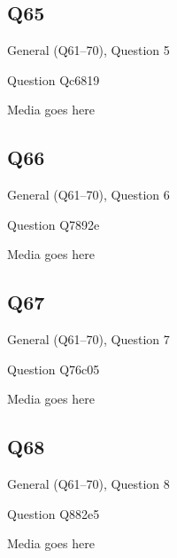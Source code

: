 \documentclass[11pt]{beamer}
\begin{document}
\subsection*{Q65}
\begin{frame}[t]{General (Q61--70), Question 5}
\vspace{2em}
\begin{block}{Question}
Qc6819
\end{block}
\begin{center}
Media goes here
\end{center}
\end{frame}
    

\subsection*{Q66}
\begin{frame}[t]{General (Q61--70), Question 6}
\vspace{2em}
\begin{block}{Question}
Q7892e
\end{block}
\begin{center}
Media goes here
\end{center}
\end{frame}
    

\subsection*{Q67}
\begin{frame}[t]{General (Q61--70), Question 7}
\vspace{2em}
\begin{block}{Question}
Q76c05
\end{block}
\begin{center}
Media goes here
\end{center}
\end{frame}
    

\subsection*{Q68}
\begin{frame}[t]{General (Q61--70), Question 8}
\vspace{2em}
\begin{block}{Question}
Q882e5
\end{block}
\begin{center}
Media goes here
\end{center}
\end{frame}
    
\end{document}
